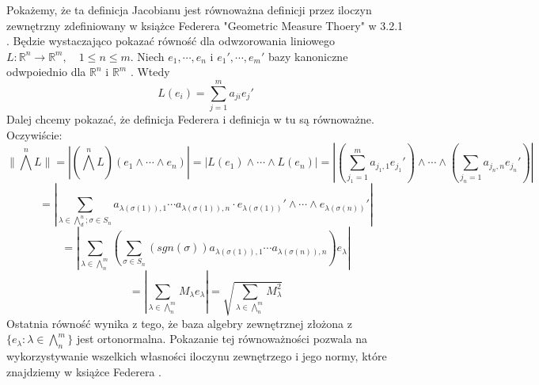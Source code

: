 \begin{lem}
	Pokażemy, że ta definicja Jacobianu jest równoważna definicji przez iloczyn zewnętrzny zdefiniowany w książce Federera "Geometric Measure Thoery" w 3.2.1 \citep{Federer}. Będzie wystaczająco pokazać równość dla odwzorowania liniowego $L: \mathbb{R}^n \rightarrow \mathbb{R}^m, \quad 1 \leq n \leq m$. Niech $e_1, \cdots, e_n$ i $e_1', \cdots, e_m'$ bazy kanoniczne odwpoiednio dla $\mathbb{R}^n$ i $\mathbb{R}^m$ . Wtedy $$
		L(e_i) = \sum_{j=1}^m a_{ji} e_j'
	$$
	Dalej chcemy pokazać, że definicja Federera i definicja w tu są równoważne. Oczywiście:
	$$
		\| \bigwedge^n L \| = |(\bigwedge^n L) (e_1 \wedge \cdots \wedge e_n)| 
		= |L(e_1) \wedge \cdots \wedge L(e_n)| 
		= \left| (\sum^m_{j_1=1}a_{j_1, 1} e_{j_1}') \wedge \cdots \wedge (\sum_{j_n=1} a_{j_n, n} e_{j_n}') \right| 
	$$
	$$
		= \left| \sum_{\lambda \in \bigwedge^n_d; \sigma \in S_n} a_{\lambda(\sigma(1)), 1} \cdots a_{\lambda(\sigma(1)), n} 
			\cdot e_{\lambda(\sigma(1))}' \wedge \cdots \wedge e_{\lambda(\sigma(n))}'\right|
	$$
	$$
		= \left| \sum_{\lambda \in \bigwedge^m_n} \left( \sum_{\sigma \in S_n} (sgn(\sigma))a_{\lambda(\sigma(1)), 1} \cdots a_{\lambda(\sigma(n)), n} \right) e_{\lambda} \right|
	$$
	$$
		= \left| \sum_{\lambda \in \bigwedge_n^m} M_{\lambda} e_{\lambda} \right| = \sqrt{\sum_{\lambda \in \bigwedge_n^m} M_{\lambda}^2}
	$$
	Ostatnia równość wynika z tego, że baza algebry zewnętrznej złożona z $\{ e_{\lambda}: \lambda \in \bigwedge_n^m\}$ jest ortonormalna.\newline
	Pokazanie tej równoważności pozwala na wykorzystywanie wszelkich własności iloczynu zewnętrzego i jego normy, które znajdziemy w książce Federera \citep{Federer}.
\end{lem}